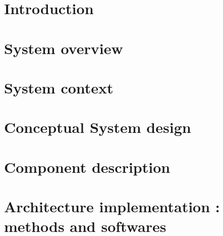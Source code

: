 \documentclass[a4paper,twoside,openright,makeidx,12pt]{book}
\begin{document}
\pagestyle{empty}
\renewcommand{\arraystretch}{1.8}



\tableofcontents


\pagestyle{fancy}
\cleardoublepage

\chapter{Introduction}
\label{Sec:ADD-Intoduction}



\newpage
\chapter{System overview}
\label{Sec:ADD-SystemOverview}


\newpage
\chapter{System context}
\label{Sec:ADD-SystemContext}


\newpage
\chapter{Conceptual System design}
\label{Sec:ADD-ConceptualSystemDesign}




\newpage
\chapter{Component description}
\label{Sec:ADD-ComponentDescription}



\newpage
\chapter{Architecture implementation : methods and softwares}
\label{Sec:ADD-ComponentImplementation}

\end{document}
